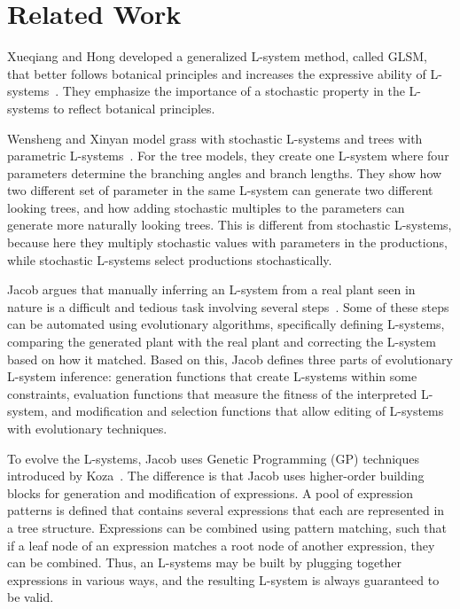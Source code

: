 \chapter{Related Work}
Xueqiang and Hong developed a generalized L-system method, called GLSM, that better follows botanical principles and increases the expressive ability of L-systems~\cite{Xueqiang2012}.
They emphasize the importance of a stochastic property in the L-systems to reflect botanical principles.

Wensheng and Xinyan model grass with stochastic L-systems and trees with parametric L-systems~\cite{Wensheng2010}.
For the tree models, they create one L-system where four parameters determine the branching angles and branch lengths.
They show how two different set of parameter in the same L-system can generate two different looking trees, and how adding stochastic multiples to the parameters can generate more naturally looking trees.
This is different from stochastic L-systems, because here they multiply stochastic values with parameters in the productions, while stochastic L-systems select productions stochastically.

Jacob argues that manually inferring an L-system from a real plant seen in nature is a difficult and tedious task involving several steps~\cite{Jacob1998}.
Some of these steps can be automated using evolutionary algorithms, specifically defining L-systems, comparing the generated plant with the real plant and correcting the L-system based on how it matched.
Based on this, Jacob defines three parts of evolutionary L-system inference: generation functions that create L-systems within some constraints, evaluation functions that measure the fitness of the interpreted L-system, and modification and selection functions that allow editing of L-systems with evolutionary techniques.

To evolve the L-systems, Jacob uses Genetic Programming (GP) techniques introduced by Koza~\cite{Koza1993}.
The difference is that Jacob uses higher-order building blocks for generation and modification of expressions.
A pool of expression patterns is defined that contains several expressions that each are represented in a tree structure.
Expressions can be combined using pattern matching, such that if a leaf node of an expression matches a root node of another expression, they can be combined.
Thus, an L-systems may be built by plugging together expressions in various ways, and the resulting L-system is always guaranteed to be valid.

